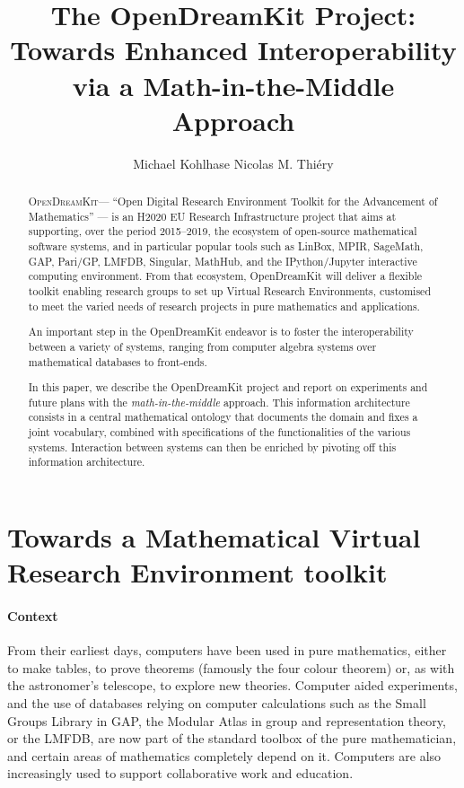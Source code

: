 \documentclass{llncs}
\title{The OpenDreamKit Project:\\
  Towards Enhanced Interoperability\\
  via a Math-in-the-Middle Approach}
\author{Michael Kohlhase\inst{1} Nicolas M. Thi\'ery\inst{2} }
\institute{Jacobs University, Bremen, Germany \and Universit\'e Paris-Sud, Paris, France}
\newcommand{\software}[1]{\textsc{#1}\xspace}
\newcommand{\ODK}{\software{OpenDreamKit}}
\begin{document}
\maketitle
\begin{abstract}
  \ODK --- ``Open Digital Research Environment Toolkit for the
  Advancement of Mathematics'' --- is an H2020 EU Research
  Infrastructure project that aims at supporting, over the period
  2015--2019, the ecosystem of open-source mathematical software
  systems, and in particular popular tools such as LinBox, MPIR,
  SageMath, GAP, Pari/GP, LMFDB, Singular, MathHub, and the
  IPython/Jupyter interactive computing environment. From that
  ecosystem, OpenDreamKit will deliver a flexible toolkit enabling
  research groups to set up Virtual Research Environments, customised
  to meet the varied needs of research projects in pure mathematics
  and applications.

  An important step in the OpenDreamKit endeavor is to foster the
  interoperability between a variety of systems, ranging from computer
  algebra systems over mathematical databases to front-ends.

  In this paper, we describe the OpenDreamKit project and report on experiments and future
  plans with the \emph{math-in-the-middle} approach.  This information architecture
  consists in a central mathematical ontology that documents the domain and fixes a joint
  vocabulary, combined with specifications of the functionalities of the various
  systems. Interaction between systems can then be enriched by pivoting off this
  information architecture.
\end{abstract}

\section{Towards a Mathematical Virtual Research Environment toolkit}


\paragraph{Context}


From their earliest days, computers have been used in pure
mathematics, either to make tables, to prove theorems (famously the
four colour theorem) or, as with the astronomer’s telescope, to
explore new theories. Computer aided experiments, and the use of
databases relying on computer calculations such as the Small Groups
Library in GAP, the Modular Atlas in group and representation theory,
or the LMFDB, are now part of the standard toolbox of the pure
mathematician, and certain areas of mathematics completely depend on
it. Computers are also increasingly used to support collaborative work
and education.
\end{document}
